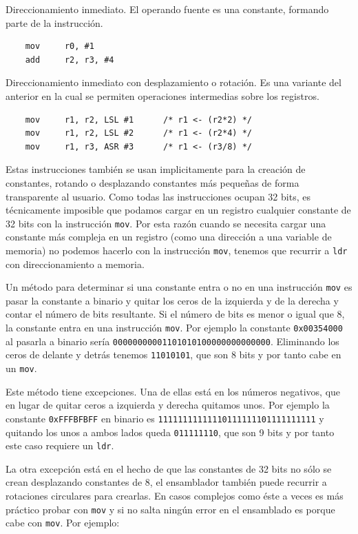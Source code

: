 \begin{descript}
  \item[Direccionamiento inmediato.]
    El operando fuente es una constante, formando parte de la instrucción.
\begin{lstlisting}
    mov     r0, #1
    add     r2, r3, #4
\end{lstlisting}
  \item[Direccionamiento inmediato con desplazamiento o rotación.]
    Es una variante del anterior en la cual se permiten operaciones intermedias
    sobre los registros.
\begin{lstlisting}
    mov     r1, r2, LSL #1      /* r1 <- (r2*2) */
    mov     r1, r2, LSL #2      /* r1 <- (r2*4) */
    mov     r1, r3, ASR #3      /* r1 <- (r3/8) */
\end{lstlisting}
    Estas instrucciones también se usan implicitamente para la creación de constantes, rotando o
    desplazando constantes más pequeñas de forma transparente al usuario. Como todas
    las instrucciones ocupan 32 bits, es técnicamente imposible que podamos cargar
    en un registro cualquier constante de 32 bits con la instrucción {\tt mov}. Por
    esta razón cuando se necesita cargar una constante más compleja en un registro
    (como una dirección a una variable de memoria) no podemos hacerlo con la instrucción
    {\tt mov}, tenemos que recurrir a {\tt ldr} con direccionamiento a memoria.

    Un método para determinar si una constante entra o no en una instrucción {\tt mov} es
    pasar la constante a binario y quitar los ceros de la izquierda y de la derecha y contar
    el número de bits resultante. Si el número de bits es menor o igual que 8, la constante
    entra en una instrucción {\tt mov}. Por ejemplo la constante {\tt 0x00354000} al pasarla
    a binario sería {\tt 00000000001101010100000000000000}. Eliminando los ceros de delante
    y detrás tenemos {\tt 11010101}, que son 8 bits y por tanto cabe en un {\tt mov}.

    Este método tiene excepciones. Una de ellas está en los números negativos, que en lugar
    de quitar ceros a izquierda y derecha quitamos unos. Por ejemplo la constante {\tt 0xFFFBFBFF}
    en binario es {\tt 11111111111110111111101111111111} y quitando los unos a ambos lados
    queda {\tt 011111110}, que son 9 bits y por tanto este caso requiere un {\tt ldr}.

    La otra excepción está en el hecho de que las constantes de 32 bits no sólo se crean
    desplazando constantes de 8, el ensamblador también puede recurrir a rotaciones circulares
    para crearlas. En casos complejos como éste a veces es más práctico probar con {\tt mov}
    y si no salta ningún error en el ensamblado es porque cabe con {\tt mov}. Por ejemplo:


\end{descript}
